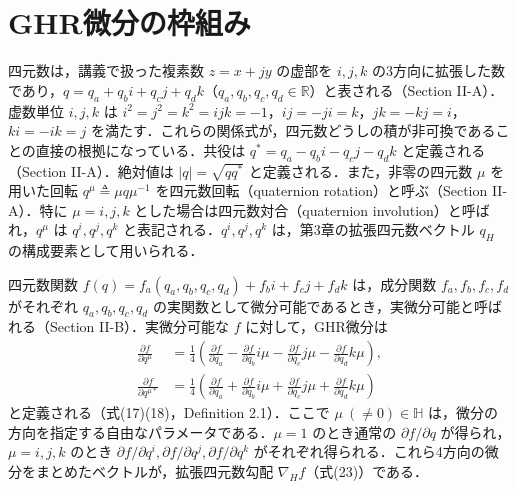 \documentclass[twocolumn, 9pt]{jsarticle}
\begin{document}
\section{GHR微分の枠組み}

四元数は，講義で扱った複素数 $z=x+jy$ の虚部を $i,j,k$ の3方向に拡張した数であり，$q = q_a + q_b i + q_c j + q_d k$（$q_a,q_b,q_c,q_d\in\mathbb{R}$）と表される（Section II-A）．虚数単位 $i,j,k$ は $i^2=j^2=k^2=ijk=-1$，$ij=-ji=k$，$jk=-kj=i$，$ki=-ik=j$ を満たす．これらの関係式が，四元数どうしの積が非可換であることの直接の根拠になっている．共役は $q^*=q_a-q_bi-q_cj-q_dk$ と定義される（Section II-A）．絶対値は $|q|=\sqrt{qq^*}$ と定義される．また，非零の四元数 $\mu$ を用いた回転 $q^\mu \triangleq \mu q \mu^{-1}$ を四元数回転（quaternion rotation）と呼ぶ（Section II-A）．特に $\mu=i,j,k$ とした場合は四元数対合（quaternion involution）と呼ばれ，$q^\mu$ は $q^i, q^j, q^k$ と表記される．$q^i,q^j,q^k$ は，第3章の拡張四元数ベクトル $q_H$ の構成要素として用いられる．

四元数関数 $f(q)=f_a(q_a,q_b,q_c,q_d)+f_bi+f_cj+f_dk$ は，成分関数 $f_a,f_b,f_c,f_d$ がそれぞれ $q_a,q_b,q_c,q_d$ の実関数として微分可能であるとき，実微分可能と呼ばれる（Section II-B）．実微分可能な $f$ に対して，GHR微分は
\begin{align*}
\frac{\partial f}{\partial q^\mu} &= \frac{1}{4}\left(\frac{\partial f}{\partial q_a} - \frac{\partial f}{\partial q_b}i\mu - \frac{\partial f}{\partial q_c}j\mu - \frac{\partial f}{\partial q_d}k\mu\right), \\
\frac{\partial f}{\partial q^{\mu*}} &= \frac{1}{4}\left(\frac{\partial f}{\partial q_a} + \frac{\partial f}{\partial q_b}i\mu + \frac{\partial f}{\partial q_c}j\mu + \frac{\partial f}{\partial q_d}k\mu\right)
\end{align*}
と定義される（式(17)(18)，Definition 2.1）．ここで $\mu\ (\neq0)\in\mathbb{H}$ は，微分の方向を指定する自由なパラメータである．$\mu=1$ のとき通常の $\partial f/\partial q$ が得られ，$\mu=i,j,k$ のとき $\partial f/\partial q^i, \partial f/\partial q^j, \partial f/\partial q^k$ がそれぞれ得られる．これら4方向の微分をまとめたベクトルが，拡張四元数勾配 $\nabla_Hf$（式(23)）である．
\end{document}
